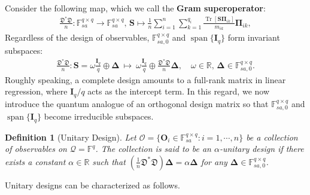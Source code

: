 \documentclass[noinfoline]{imsart}\setcounter{tocdepth}{2}
\renewcommand{\b}[1]{\mathbb{#1}} %
\newcommand{\m}[1]{\mathbf{#1}} %
\newcommand{\s}[1]{\mathscr{#1}} %
\newcommand{\f}[1]{\mathfrak{#1}} %
\renewcommand{\c}[1]{\mathcal{#1}} %
\newcommand{\mb}[1]{\boldsymbol{#1}} %
\newcommand{\tr}[1]{\operatorname{Tr}\left[#1\right]}
\DeclareMathOperator*{\spann}{span}
\theoremstyle{plain}
\newtheorem{definition}[theorem]{Definition}
\begin{document}
Consider the following map, which we call the \textbf{Gram superoperator}:
\begin{align}\label{eq:design2spd}
    \frac{\f{D}^{*} \f{D}}{n}: \b{F}_{sa}^{q \times q} \to \b{F}_{sa}^{q \times q}, \,  \m{S} \mapsto \frac{1}{n} \sum_{i=1}^{n} \sum_{k=1}^{q_{i}} \frac{\tr{\m{S} \m{\Pi}_{ik}}}{m_{ik}} \m{\Pi}_{ik},
\end{align}
Regardless of the design of observables, $\b{F}_{sa, 0}^{q \times q}$ and $\spann\{\m{I}_{q}\}$ form invariant subspaces:
\begin{align*}%
    \frac{\f{D}^{*} \f{D}}{n} : \m{S} = \omega \frac{\m{I}_{q}}{q} \oplus \mb{\Delta} \ \mapsto \ \omega \frac{\m{I}_{q}}{q} \oplus \frac{\f{D}^{*} \f{D}}{n} \mb{\Delta}, \quad \omega \in \b{R}, \, \mb{\Delta} \in \b{F}_{sa, 0}^{q \times q}.
\end{align*}
Roughly speaking, a complete design amounts to a full-rank matrix in linear regression, where $\m{I}_{q}/q$ acts as the intercept term. In this regard, we now introduce the quantum analogue of an orthogonal design matrix so that $\b{F}_{sa, 0}^{q \times q}$ and $\spann\{\m{I}_{q}\}$ become irreducible subspaces.

\begin{definition}[Unitary Design]
Let $\s{O} = \{\m{O}_{i} \in \b{F}_{sa}^{q \times q}: i = 1, \cdots, n\}$ be a collection of observables on $\c{Q} = \b{F}^{q}$. The collection is said to be an $\alpha$-\emph{unitary design} if there exists a constant $\alpha \in \b{R}$ such that $\left(\tfrac{1}{n}\f{D}^{*} \f{D}\right) \mb{\Delta} = \alpha \mb{\Delta}$
for any $\mb{\Delta} \in \b{F}_{sa, 0}^{q \times q}$.
\end{definition}

Unitary designs can be characterized as follows. 
\end{document}
